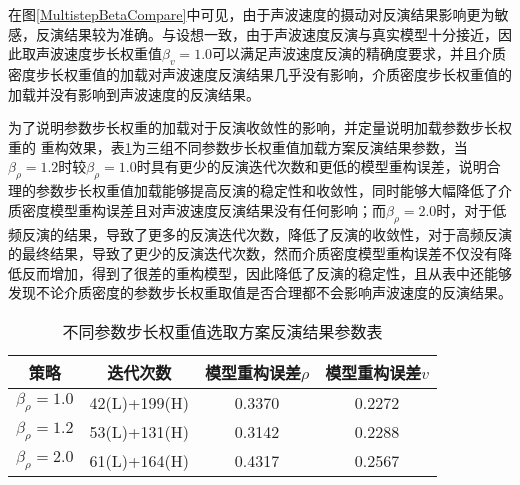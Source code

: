 \documentclass[12pt]{article}
\begin{document}
\par
在图\ref{MultistepBetaCompare}中可见，由于声波速度的摄动对反演结果影响更为敏感，反演结果较为准确。与设想一致，由于声波速度反演与真实模型十分接近，因此取声波速度步长权重值$\beta_v=1.0$可以满足声波速度反演的精确度要求，并且介质密度步长权重值的加载对声波速度反演结果几乎没有影响，介质密度步长权重值的加载并没有影响到声波速度的反演结果。
\par
为了说明参数步长权重的加载对于反演收敛性的影响，并定量说明加载参数步长权重的
重构效果，表\ref{ErrorTab}为三组不同参数步长权重值加载方案反演结果参数，当$\beta_{\rho}=1.2$时较$\beta_{\rho}=1.0$时具有更少的反演迭代次数和更低的模型重构误差，说明合理的参数步长权重值加载能够提高反演的稳定性和收敛性，同时能够大幅降低了介质密度模型重构误差且对声波速度反演结果没有任何影响；而$\beta_{\rho}=2.0$时，对于低频反演的结果，导致了更多的反演迭代次数，降低了反演的收敛性，对于高频反演的最终结果，导致了更少的反演迭代次数，然而介质密度模型重构误差不仅没有降低反而增加，得到了很差的重构模型，因此降低了反演的稳定性，且从表中还能够发现不论介质密度的参数步长权重取值是否合理都不会影响声波速度的反演结果。
\par
\begin{table}[H]
\centering
\caption{不同参数步长权重值选取方案反演结果参数表}\label{ErrorTab}
\renewcommand\tabcolsep{1em}
\begin{tabular}{cccc}
\toprule
{策略} & {迭代次数} & {模型重构误差$\rho$} & {模型重构误差$v$}\\
\midrule 
$\beta_{\rho}=1.0$ & 42(L)+199(H) & 0.3370 & 0.2272\\
$\beta_{\rho}=1.2$ & 53(L)+131(H) & 0.3142 & 0.2288\\
$\beta_{\rho}=2.0$ & 61(L)+164(H) & 0.4317 & 0.2567\\
\bottomrule
\end{tabular}
\end{table}
\end{document}
